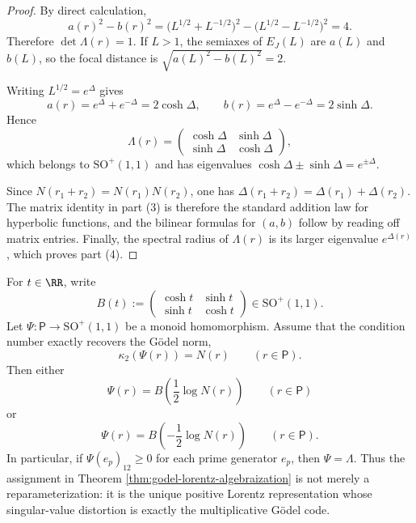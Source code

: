 \begin{proof}
By direct calculation,
\[
a(r)^2-b(r)^2
=\bigl(L^{1/2}+L^{-1/2}\bigr)^2-\bigl(L^{1/2}-L^{-1/2}\bigr)^2
=4.
\]
Therefore \(\det\Lambda(r)=1\). If \(L>1\), the semiaxes of \(E_J(L)\) are \(a(L)\) and \(b(L)\), so the focal distance is \(\sqrt{a(L)^2-b(L)^2}=2\).

Writing \(L^{1/2}=e^\Delta\) gives
\[
a(r)=e^\Delta+e^{-\Delta}=2\cosh\Delta,
\qquad
b(r)=e^\Delta-e^{-\Delta}=2\sinh\Delta.
\]
Hence
\[
\Lambda(r)=
\begin{pmatrix}
\cosh\Delta & \sinh\Delta\\
\sinh\Delta & \cosh\Delta
\end{pmatrix},
\]
which belongs to \(\mathrm{SO}^+(1,1)\) and has eigenvalues \(\cosh\Delta\pm\sinh\Delta=e^{\pm\Delta}\).

Since \(N(r_1+r_2)=N(r_1)N(r_2)\), one has \(\Delta(r_1+r_2)=\Delta(r_1)+\Delta(r_2)\). The matrix identity in part (3) is therefore the standard addition law for hyperbolic functions, and the bilinear formulas for \((a,b)\) follow by reading off matrix entries. Finally, the spectral radius of \(\Lambda(r)\) is its larger eigenvalue \(e^{\Delta(r)}\), which proves part (4).
\end{proof}

\begin{theorem}\label{thm:godel-lorentz-dictionary-rigidity}
For \(t\in\RR\), write
\[
B(t):=
\begin{pmatrix}
\cosh t&\sinh t\\
\sinh t&\cosh t
\end{pmatrix}
\in\mathrm{SO}^+(1,1).
\]
Let \(\Psi:\mathsf P\to\mathrm{SO}^+(1,1)\) be a monoid homomorphism. Assume that the condition number exactly recovers the G\"odel norm,
\[
\kappa_2(\Psi(r))=N(r)\qquad(r\in\mathsf P).
\]
Then either
\[
\Psi(r)=B\!\left(\frac12\log N(r)\right)\qquad(r\in\mathsf P)
\]
or
\[
\Psi(r)=B\!\left(-\frac12\log N(r)\right)\qquad(r\in\mathsf P).
\]
In particular, if \(\Psi(e_p)_{12}\ge 0\) for each prime generator \(e_p\), then \(\Psi=\Lambda\). Thus the assignment in Theorem \ref{thm:godel-lorentz-algebraization} is not merely a reparameterization: it is the unique positive Lorentz representation whose singular-value distortion is exactly the multiplicative G\"odel code.
\end{theorem}

